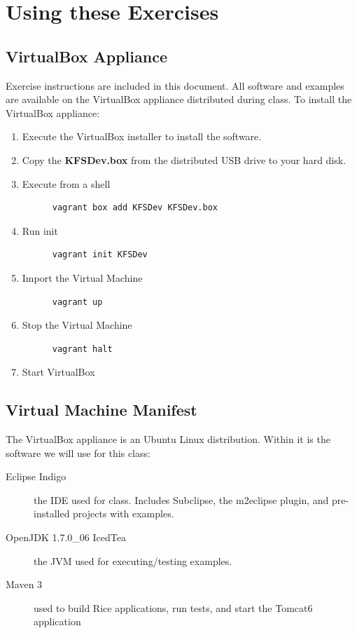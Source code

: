 \documentclass[letterpaper,notitlepage,12pt]{book}
\begin{document}
\section*{Using these Exercises}
\subsection*{VirtualBox Appliance}
Exercise instructions are included in this document. All software and
examples are available on the VirtualBox appliance distributed during
class. To install the VirtualBox appliance:
\begin{enumerate}
  \item Execute the VirtualBox installer to install the software.
  \item Copy the \textbf{KFSDev.box} from the distributed USB drive to
    your hard disk.
  \item Execute from a shell 
    \begin{verbatim}
      vagrant box add KFSDev KFSDev.box
    \end{verbatim}
  \item Run init
    \begin{verbatim}
      vagrant init KFSDev
    \end{verbatim}
  \item Import the Virtual Machine
    \begin{verbatim}
      vagrant up
    \end{verbatim}
  \item Stop the Virtual Machine
    \begin{verbatim}
      vagrant halt
    \end{verbatim}
  \item Start VirtualBox
\end{enumerate}

\subsection*{Virtual Machine Manifest}
The VirtualBox appliance is an Ubuntu Linux distribution. Within it is
the software we will use for this class:
\begin{description}
  \item [Eclipse Indigo] the IDE used for class. Includes Subclipse,
    the m2eclipse plugin, and pre-installed projects with examples.
  \item [OpenJDK 1.7.0\_06 IcedTea] the JVM used for executing/testing
    examples.
  \item [Maven 3] used to build Rice applications, run tests, and
    start the Tomcat6 application
\end{description}
\end{document}
